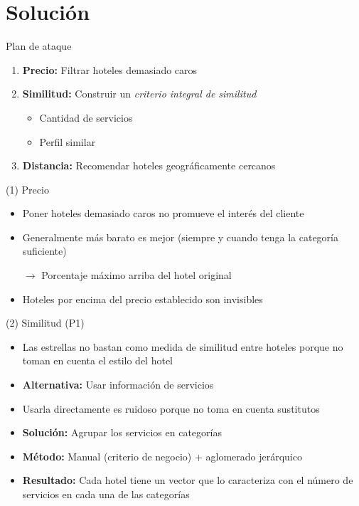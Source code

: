 \documentclass{beamer}
\begin{document}
\section{Solución}

\begin{frame}{Plan de ataque}
	\begin{enumerate}%
		\item \textbf{Precio:} Filtrar hoteles demasiado caros
		\item \textbf{Similitud:} Construir un \textit{criterio integral de similitud}
		\begin{itemize}
			\item Cantidad de servicios
			\item Perfil similar
		\end{itemize}
		\item \textbf{Distancia:} Recomendar hoteles geográficamente cercanos
	\end{enumerate}
\end{frame}

\begin{frame}{(1) Precio}
	\begin{itemize}%
		\item Poner hoteles demasiado caros no promueve el interés del cliente
		\item Generalmente más barato es mejor (siempre y cuando tenga la categoría suficiente)
		\item[$\mathbf{\rightarrow}$] Porcentaje máximo arriba del hotel original
		\item Hoteles por encima del precio establecido son invisibles
	\end{itemize}
\end{frame}

\begin{frame}{(2) Similitud (P1)}
	\begin{itemize}%
		\item Las estrellas no bastan como medida de similitud entre hoteles porque no toman en cuenta el estilo del hotel
		\item \textbf{Alternativa:} Usar información de servicios
		\item Usarla directamente es ruidoso porque no toma en cuenta sustitutos
		\item \textbf{Solución:} Agrupar los servicios en categorías
		\item \textbf{Método:} Manual (criterio de negocio) + aglomerado jerárquico
		\item \textbf{Resultado:} Cada hotel tiene un vector que lo caracteriza con el número de servicios en cada una de las categorías
	\end{itemize}
\end{frame}
\end{document}
